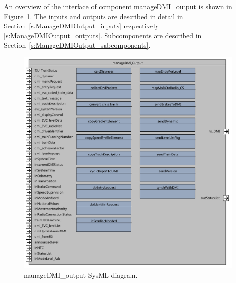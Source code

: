 An overview of the interface of component manageDMI\_output is shown in Figure~\ref{f:ManageDMIOutput}. The inputs and outputs are described in detail in Section~\ref{s:ManageDMIOutput_inputs} respectively \ref{s:ManageDMIOutput_outputs}. Subcomponents are described in Section~\ref{s:ManageDMIOutput_subcomponents}.

\begin{figure}
\center
\includegraphics[width=\textwidth]{images/F2_11_manageDMI_Output.pdf}
\caption{manageDMI\_output SysML diagram.}\label{f:ManageDMIOutput}
\end{figure}

